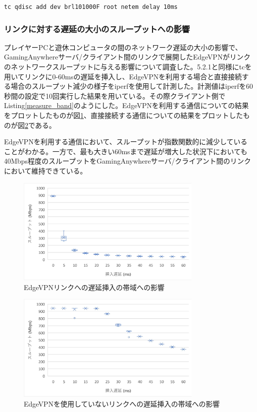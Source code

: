 \begin{lstlisting}[caption=遅延挿入,label=add_ratency]
    tc qdisc add dev brl101000F root netem delay 10ms
\end{lstlisting}

\subsubsection{リンクに対する遅延の大小のスループットへの影響}
プレイヤーPCと遊休コンピュータの間のネットワーク遅延の大小の影響で、GamingAnywhereサーバ/クライアント間のリンクで展開したEdgeVPNがリンクのネットワークスループットに与える影響について調査した。5.2.1と同様にtcを用いてリンクに0-60msの遅延を挿入し、EdgeVPNを利用する場合と直接接続する場合のスループット減少の様子をiperf\cite{iperf}を使用して計測した。計測値はiperfを60秒間の設定で10回実行した結果を用いている。その際クライアント側でListing\ref{measure_band}のようにした。EdgeVPNを利用する通信についての結果をプロットしたものが図\ref{fig:band_with_edge}、直接接続する通信についての結果をプロットしたものが図\ref{fig:band_without_edge}である。

EdgeVPNを利用する通信において、スループットが指数関数的に減少していることがわかる。一方で、最も大きい60msまで遅延が増大した状況下においても40Mbps程度のスループットをGamingAnywhereサーバ/クライアント間のリンクにおいて維持できている。

\begin{figure}[h!]
    \centering
    \includegraphics[width=0.8\textwidth,keepaspectratio,clip]{img/bandwidth_withEdgeVPN.pdf}
    \caption{EdgeVPNリンクへの遅延挿入の帯域への影響}
    \label{fig:band_with_edge}
\end{figure}

\begin{figure}[h!]
    \centering
    \includegraphics[width=0.8\textwidth,keepaspectratio,clip]{img/bandwidth_withoutEdgeVPN.pdf}
    \caption{EdgeVPNを使用していないリンクへの遅延挿入の帯域への影響}
    \label{fig:band_without_edge}
\end{figure}

